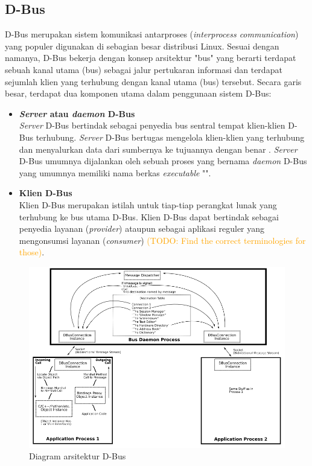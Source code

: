 
\subsection{D-Bus}

D-Bus merupakan sistem komunikasi antarproses (\textit{interprocess communication}) yang populer digunakan di sebagian besar distribusi Linux. Sesuai dengan namanya, D-Bus bekerja dengan konsep arsitektur "bus" yang berarti terdapat sebuah kanal utama (bus) sebagai jalur pertukaran informasi dan terdapat sejumlah klien yang terhubung dengan kanal utama (bus) tersebut. Secara garis besar, terdapat dua komponen utama dalam penggunaan sistem D-Bus:

\begin{itemize}
    \item \textbf{\textit{Server} atau \textit{daemon} D-Bus}\\
    \textit{Server} D-Bus bertindak sebagai penyedia bus sentral tempat klien-klien D-Bus terhubung. \textit{Server} D-Bus bertugas mengelola klien-klien yang terhubung dan menyalurkan data dari sumbernya ke tujuannya dengan benar \cite{qt-introduction-to-dbus}. \textit{Server} D-Bus umumnya dijalankan oleh sebuah proses yang bernama \textit{daemon} D-Bus yang umumnya memiliki nama berkas \textit{executable} "".

    \item \textbf{Klien D-Bus}\\
    Klien D-Bus merupakan istilah untuk tiap-tiap perangkat lunak yang terhubung ke bus utama D-Bus. Klien D-Bus dapat bertindak sebagai penyedia layanan (\textit{provider}) ataupun sebagai aplikasi reguler yang mengonsumsi layanan (\textit{consumer}) \textcolor{orange}{(TODO: Find the correct terminologies for those)}.
\end{itemize}

\begin{figure}
    \centering
    \includegraphics[width=0.5\linewidth]{contents//chapter-2/dbus-diagram.png}
    \caption{Diagram arsitektur D-Bus \cite{dbus-main-project-page}}
    \label{fig:enter-label}
\end{figure}

